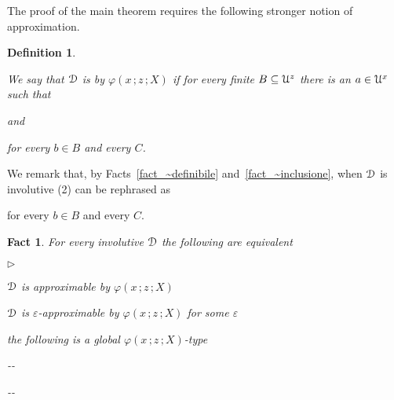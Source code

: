 \documentclass{amsproc}
\newcommand{\mylabel}[1]{{#1}\hfill}
\renewenvironment{itemize}
  {\begin{list}{$\triangleright$}{%
  \setlength{\parskip}{0mm}
  \setlength{\topsep}{.1\baselineskip}
  \setlength{\rightmargin}{0mm}
  \setlength{\listparindent}{0mm}
  \setlength{\itemindent}{0mm}
  \setlength{\labelwidth}{3ex}
  \setlength{\itemsep}{.1\baselineskip}
  \setlength{\parsep}{.1\baselineskip}
  \setlength{\partopsep}{0mm}
  \setlength{\labelsep}{1ex}
  \setlength{\leftmargin}{\labelwidth+\labelsep}
  \let\makelabel\mylabel}}{%
\end{list}}
\newcounter{thm}
\theoremstyle{mio}
\newtheorem{fact}[thm]{Fact}\tcolorboxenvironment{fact}{mythm}
\newtheorem{definition}[thm]{Definition}\tcolorboxenvironment{definition}{mythm}
\renewcommand*{\emph}[1]{%
   \smash{\tikz[baseline]\node[rectangle, fill=teal!25, rounded corners, inner xsep=0.5ex, inner ysep=0.2ex, anchor=base, minimum height = 2.7ex]{\strut #1};}}
\begin{document}
The proof of the main theorem requires the following stronger notion of approximation.

\begin{definition}\label{def_e_approx_X}\strut
  We say that ${\EuScript D}$ is \emph{$\varepsilon$-approximable\/} by $\varphi(x\,;z\,;X)$ if for every finite $B\subseteq{\EuScript U}^z$ there is an $a\in{\EuScript U}^x$ such that\smallskip

  \quad and\smallskip

  \hfill for every $b\in B$ and every $C$.\smallskip
\end{definition}

We remark that, by Facts~\ref{fact_~definibile} and~\ref{fact_~inclusione}, when ${\EuScript D}$ is involutive 
%
%
(2) can be rephrased as

\hfill for every $b\in B$ and every $C$.

\begin{fact}
  For every involutive ${\EuScript D}$ the following are equivalent
  \begin{itemize}
    \item [1.] ${\EuScript D}$ is approximable by $\varphi(x\,;z\,;X)$
    \item [2.] ${\EuScript D}$ is $\varepsilon$-approximable by $\varphi(x\,;z\,;X)$ for some $\varepsilon$
    \item [3.] the following is a global $\varphi(x\,;z\,;X)$-type\smallskip
    
    \noindent\kern-\kern-
    \smallskip

    \noindent\kern-\kern-
  
  \end{itemize}
\end{fact}
\end{document}
